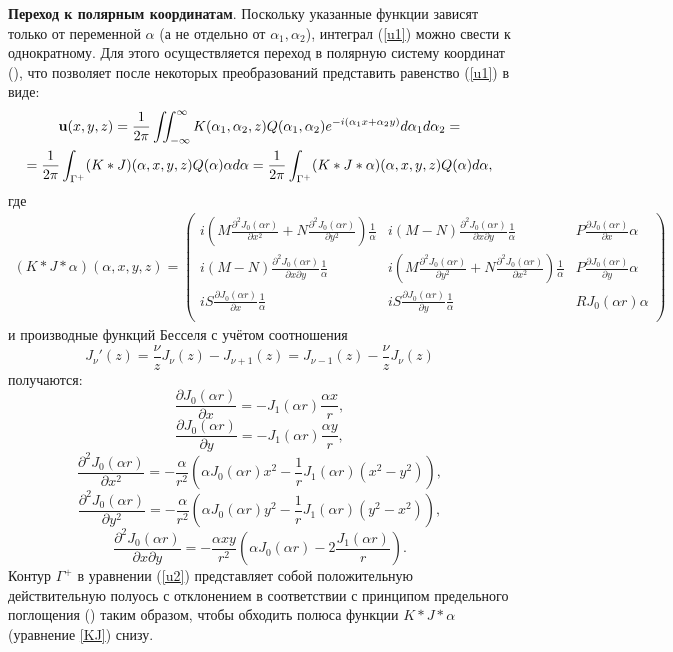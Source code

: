 \documentclass[a4paper, 12pt]{article}
\newcommand{\jone}[1]{\frac{\partial J_0(\alpha r)}{\partial #1}}
\newcommand{\jtwo}[1]{\frac{\partial^2 J_0(\alpha r)}{\partial #1^2}}
\newcommand{\jxy}{\frac{\partial^2 J_0(\alpha r)}{\partial x \partial y}}
\begin{document}
{\bf Переход к полярным координатам}. Поскольку указанные функции зависят только от переменной $\alpha$ (а не отдельно от $\alpha_1,\alpha_2$),
интеграл (\ref{u1}) можно свести к однократному.
Для этого осуществляется переход в полярную систему координат (\cite{g89}),
что позволяет после некоторых преобразований представить равенство (\ref{u1}) в виде:
\begin{multline}
    {\bf u}(x,y,z)=\frac{1}{2\pi}\iint_{-\infty}^{\infty}K(\alpha_1,\alpha_2,z)Q(\alpha_1,\alpha_2)e^{-i(\alpha_1 x+\alpha_2 y)}d\alpha_1 d\alpha_2=\\
    =\frac{1}{2\pi}\int_{\Gamma^+}(K*J)(\alpha, x,y,z)Q(\alpha)\alpha d\alpha=\frac{1}{2\pi}\int_{\Gamma^+}(K*J*\alpha)(\alpha, x,y,z)Q(\alpha) d\alpha,
\label{u2}
\end{multline}
где
\begin{multline}
    (K*J*\alpha)(\alpha, x,y,z)=
\begin{pmatrix} 
    i\left( M \jtwo{x} +N \jtwo{y}\right)\frac{1}{\alpha} & i(M-N)\jxy\frac{1}{\alpha} &P\jone{x}\alpha\\ 
    i(M-N)\jxy\frac{1}{\alpha}& i\left( M \jtwo{y} +N \jtwo{x}\right)\frac{1}{\alpha} &P\jone{y}\alpha\\
    iS\jone{x}\frac{1}{\alpha}&iS\jone{y}\frac{1}{\alpha} & R J_0(\alpha r)\alpha\\
\end{pmatrix}
\label{KJ}
\end{multline}
и производные функций Бесселя с учётом соотношения
\begin{equation}
    J_{\nu}'(z)=\frac{\nu}{z}J_{\nu}(z)-J_{\nu+1}(z)=J_{\nu-1}(z)-\frac{\nu}{z}J_{\nu}(z)
\end{equation}
получаются:
\begin{equation}
    \jone{x}=-J_1(\alpha r)\frac{\alpha x}{r},
\end{equation}
\begin{equation}
    \jone{y}=-J_1(\alpha r)\frac{\alpha y}{r},
\end{equation}
\begin{equation}
    \jtwo{x}=-\frac{\alpha}{r^2}\left(\alpha J_0(\alpha r)x^2- \frac{1}{r} J_1(\alpha r)(x^2-y^2)\right),
\end{equation}
\begin{equation}
    \jtwo{y}=-\frac{\alpha}{r^2}\left(\alpha J_0(\alpha r)y^2- \frac{1}{r} J_1(\alpha r)(y^2-x^2)\right),
\end{equation}
\begin{equation}
    \jxy=-\frac{\alpha xy}{r^2}\left(\alpha J_0(\alpha r) - 2\frac{J_1(\alpha r)}{r}\right).
\end{equation}
Контур $\Gamma^+$ в уравнении (\ref{u2}) представляет собой положительную действительную полуось с отклонением в соответствии с принципом предельного поглощения (\cite{TS})
таким образом, чтобы обходить полюса функции $K*J*\alpha$ (уравнение \ref{KJ}) снизу.
\end{document}
